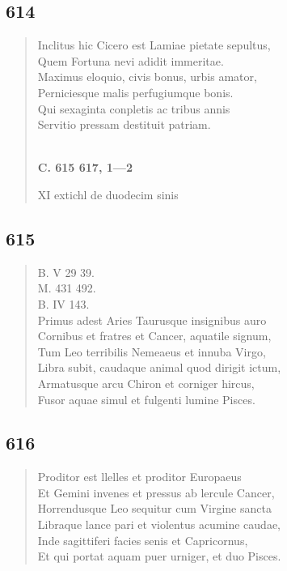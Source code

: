\documentclass[11pt, a4paper]{report}
\begin{document}
            \subsection*{614}
      \begin{verse}
      Inclitus hic Cicero est Lamiae pietate sepultus, \\ Quem Fortuna nevi adidit immeritae. \\ Maximus eloquio, civis bonus, urbis amator, \\ Perniciesque malis perfugiumque bonis. \\ Qui sexaginta conpletis ac tribus annis \\ Servitio pressam destituit patriam. \\ 
        ﻿\pagebreak 
    \begin{center} \textbf{C. 615 617, 1—2} \end{center} \marginpar{[91]} XI  \lbrack extichl de duodecim sinis \\ 
      \end{verse}
  
            \subsection*{615}
      \begin{verse}
      B. V 29 39. \\ M. 431 492. \\ B. IV 143. \\ Primus adest Aries Taurusque insignibus auro \\ Cornibus et fratres et Cancer, aquatile signum, \\ Tum Leo terribilis Nemeaeus et innuba Virgo, \\ Libra subit, caudaque animal quod dirigit ictum, \\ Armatusque arcu Chiron et corniger hircus, \\ Fusor aquae simul et fulgenti lumine Pisces. \\ 
      \end{verse}
  
            \subsection*{616}
      \begin{verse}
      Proditor est llelles et proditor Europaeus \\ Et Gemini invenes et pressus ab lercule Cancer, \\ Horrendusque Leo sequitur cum Virgine sancta \\ Libraque lance pari et violentus acumine caudae, \\ Inde sagittiferi facies senis et Capricornus, \\ Et qui portat aquam puer urniger, et duo Pisces. \\ 
      \end{verse}
  
\end{document}

